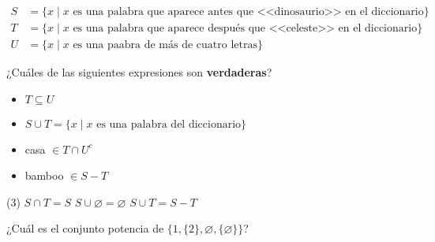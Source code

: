 \documentclass[oneside]{style}
\begin{document}
\begin{questions}[label=\protect\circled{\bfseries\arabic*}]
    \begin{align*}
        S &= \{x \; | \; x \text{ es una palabra que aparece antes que 
        <<dinosaurio>> en el diccionario}\} \\
        T &= \{x \; | \; x \text{ es una palabra que aparece después que 
        <<celeste>> en el diccionario}\} \\ 
        U &= \{x \; | \; x \text{ es una paabra de más de cuatro letras}\}
    \end{align*}

    ¿Cuáles de las siguientes expresiones son \textbf{verdaderas}? 
    \begin{itemize}
        \item $T \subseteq U$
        \item $S \cup T = \{x \; | \; x \text{ es una palabra del diccionario}\}$
        \item casa $\in T \cap U^c$
        \item bamboo $\in S-T$
    \end{itemize}

    \begin{tasks}(3)
        \task $S \cap T = S$
        \task $S \cup \varnothing = \varnothing$
        \task $S \cup T = S-T$
    \end{tasks}

    \question
    {
        ¿Cuál es el conjunto potencia de $\{1, \{2\}, \varnothing, 
        \{\varnothing\}\}$?
    }
\end{questions}
\end{document}

